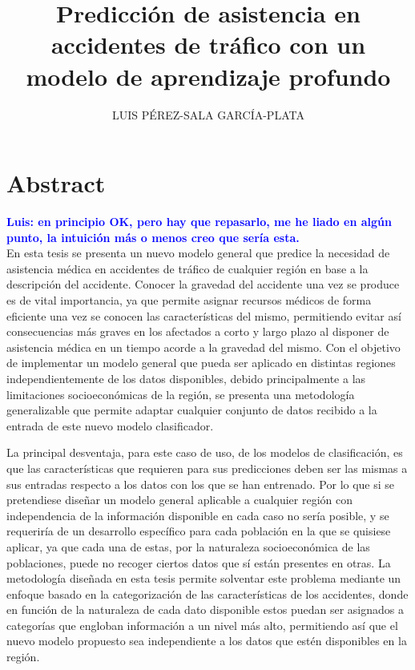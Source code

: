 \documentclass{uathesis-es}
\title{Predicción de asistencia en accidentes de tráfico con un modelo de aprendizaje profundo}
\author{LUIS PÉREZ-SALA GARCÍA-PLATA}
\begin{document}
\maketitle

\tableofcontents



\chapter*{Abstract}

\textcolor{blue}{\textbf{Luis: en principio OK, pero hay que repasarlo, me he liado en algún punto, la intuición más o menos creo que sería esta.}}\\

En esta tesis se presenta un nuevo modelo general que predice la necesidad de asistencia médica en accidentes de tráfico de cualquier región en base a la descripción del accidente. Conocer la gravedad del accidente una vez se produce es de vital importancia, ya que permite asignar recursos médicos de forma eficiente una vez se conocen las características del mismo, permitiendo evitar así consecuencias más graves en los afectados a corto y largo plazo al disponer de asistencia médica en un tiempo acorde a la gravedad del mismo. Con el objetivo de implementar un modelo general que pueda ser aplicado en distintas regiones independientemente de los datos disponibles, debido principalmente a las limitaciones socioeconómicas de la región, se presenta una metodología generalizable que permite adaptar cualquier conjunto de datos recibido a la entrada de este nuevo modelo clasificador.

La principal desventaja, para este caso de uso, de los modelos de clasificación, es que las características que requieren para sus predicciones deben ser las mismas a sus entradas respecto a los datos con los que se han entrenado. Por lo que si se pretendiese diseñar un modelo general aplicable a cualquier región con independencia de la información disponible en cada caso no sería posible, y se requeriría de un desarrollo específico para cada población en la que se quisiese aplicar, ya que cada una de estas, por la naturaleza socioeconómica de las poblaciones, puede no recoger ciertos datos que sí están presentes en otras. La metodología diseñada en esta tesis permite solventar este problema mediante un enfoque basado en la categorización de las características de los accidentes, donde en función de la naturaleza de cada dato disponible estos puedan ser asignados a categorías que engloban información a un nivel más alto, permitiendo así que el nuevo modelo propuesto sea independiente a los datos que estén disponibles en la región.
\end{document}
